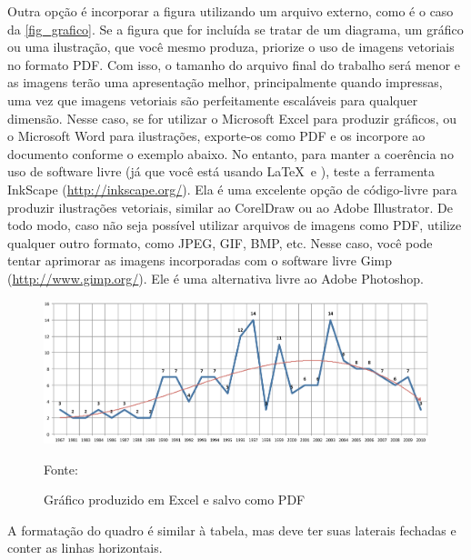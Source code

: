 Outra opção é incorporar a figura utilizando um arquivo externo, como é o caso da \autoref{fig_grafico}. Se a figura que for incluída se tratar de um diagrama, um gráfico ou uma ilustração, que você mesmo produza, priorize o uso de imagens vetoriais no formato PDF. Com isso, o tamanho do arquivo final do trabalho será menor e as imagens terão uma apresentação melhor, principalmente quando impressas, uma vez que imagens vetoriais são perfeitamente escaláveis para qualquer dimensão. Nesse caso, se for utilizar o Microsoft Excel para produzir gráficos, ou o Microsoft Word para ilustrações, exporte-os como PDF e os incorpore ao documento conforme o exemplo abaixo. No entanto, para manter a
coerência no uso de software livre (já que você está usando \LaTeX\  e \abnTeX),
teste a ferramenta \textsf{InkScape}
(\url{http://inkscape.org/}). Ela é uma excelente opção de código-livre para
produzir ilustrações vetoriais, similar ao CorelDraw ou ao Adobe
Illustrator. De todo modo, caso não seja possível
utilizar arquivos de imagens como PDF, utilize qualquer outro formato, como
JPEG, GIF, BMP, etc. Nesse caso, você pode tentar aprimorar as imagens
incorporadas com o software livre \textsf{Gimp}
(\url{http://www.gimp.org/}). Ele é uma alternativa livre ao Adobe
Photoshop. \\

\begin{figure}[H]
	\caption{\label{fig_grafico}Gráfico produzido em Excel e salvo como PDF}
	\includegraphics[scale=0.5]{USPSC-modelo-img-grafico.pdf}
	\begin{flushleft}
		Fonte: 
	\end{flushleft}	
\end{figure}


A formatação do quadro é similar à tabela, mas deve ter suas laterais fechadas e conter as linhas horizontais.


